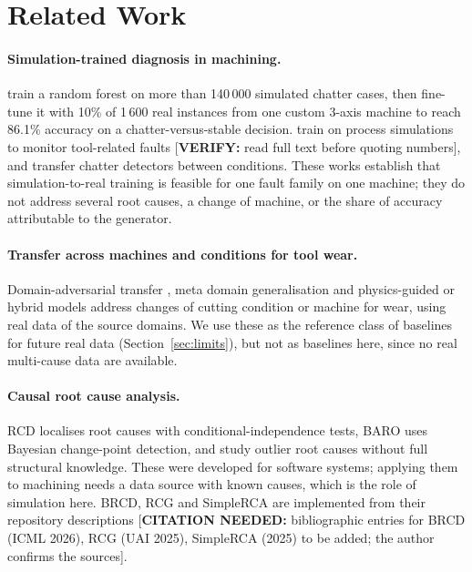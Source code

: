 \documentclass[11pt]{article}
\newcommand{\cn}[1]{{\color{orange}[\textbf{CITATION NEEDED:} #1]}}
\newcommand{\verify}[1]{{\color{blue}[\textbf{VERIFY:} #1]}}
\begin{document}
\section{Related Work}
\paragraph{Simulation-trained diagnosis in machining.}
\citet{alberts2024sim2real} train a random forest on more than 140\,000 simulated chatter cases, then fine-tune it with 10\% of 1\,600 real instances from one custom 3-axis machine to reach 86.1\% accuracy on a chatter-versus-stable decision.
\citet{ebrahimi2023smartfaults} train on process simulations to monitor tool-related faults \verify{read full text before quoting numbers}, and \citet{yesilli2022tlchatter} transfer chatter detectors between conditions.
These works establish that simulation-to-real training is feasible for one fault family on one machine; they do not address several root causes, a change of machine, or the share of accuracy attributable to the generator.

\paragraph{Transfer across machines and conditions for tool wear.}
Domain-adversarial transfer \citep{wang2020datwear}, meta domain generalisation \citep{li2023metadg} and physics-guided or hybrid models \citep{li2025physguided,yang2022hybridwear} address changes of cutting condition or machine for wear, using real data of the source domains. We use these as the reference class of baselines for future real data (Section~\ref{sec:limits}), but not as baselines here, since no real multi-cause data are available.

\paragraph{Causal root cause analysis.}
RCD \citep{ikram2022rcd} localises root causes with conditional-independence tests, BARO \citep{pham2024baro} uses Bayesian change-point detection, and \citet{orchard2025} study outlier root causes without full structural knowledge. These were developed for software systems; applying them to machining needs a data source with known causes, which is the role of simulation here. BRCD, RCG and SimpleRCA are implemented from their repository descriptions \cn{bibliographic entries for BRCD (ICML 2026), RCG (UAI 2025), SimpleRCA (2025) to be added; the author confirms the sources}.
\end{document}
